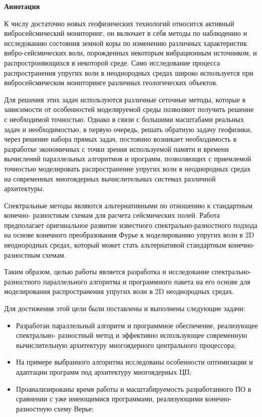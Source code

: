 \begin{singlespacing} %
\thispagestyle{empty} %
\begin{center}
\large{\textbf{Аннотация}}\\
\end{center} 
\end{singlespacing}
\begin{singlespacing}
К числу достаточно новых геофизических технологий относится активный вибросейсмический мониторинг, 
он включает в себя методы по наблюдению и исследованию состояния земной коры по изменению 
различных характеристик вибро-сейсмических волн, порожденных некоторым вибрационным источником, 
и распростроняющихся в некоторой среде. Само исследование процесса распространения упругих волн в неоднородных средах широко
используется при вибросейсмическом мониторинге различных геологических объектов.

Для решения этих задач используются различные сеточные методы,  которые в зависимости от особенностей моделируемой среды позволяют получить решение с необходимой точностью. Однако в связи с большими масштабами реальных задач и необходимостью, в первую очередь, решать обратную
задачу геофизики, через решение набора прямых задач, постоянно возникает необходимость в
разработке экономичных с точки зрения используемой памяти и времени вычислений
параллельных алгоритмов и программ, позволяющих с приемлемой точностью
моделировать распространение упругих волн в неоднородных средах на 
современных многоядерных вычислительных системах различной архитектуры.

Спектральные методы являются альтернативными по отношению к стандартным конечно-
разностным схемам для расчета сейсмических полей. Работа предполагает оригинальное развитие известного спектрально-разностного подхода
на основе конечного преобразования Фурье к моделированию упругих волн в
2D неоднородных средах, который может стать альтернативой стандартным конечно-разностным схемам.

Таким образом, целью работы является разработка  и исследование спектрально-разностного
параллельного алгоритма и программного пакета на его основе для моделирования распространения
упругих волн в 2D неоднородных средах.

Для достижения этой цели были поставлены и выполнены следующие задачи:
\begin{itemize}
    \item Разработан параллельный алгоритм и программное обеспечение, реализующее спектрально-
разностный метод и эффективно использующее современную вычислительную
архитектуру многоядерного центрального процессора;
    \item На примере выбранного алгоритма исследованы особенности оптимизации и адаптации программ под архитектуру многоядерных ЦП;
    \item Проанализированы время работы и масштабируемость разработанного ПО в
сравнении с уже имеющимися программами, реализующими конечно-разностную схему Верье;
\end{itemize}

\end{singlespacing}

\clearpage